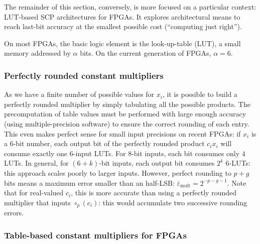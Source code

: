 \documentclass[twocolumn]{IEEEtran}
\newcommand{\abserr}{\varepsilon}
\newcommand{\maxerr}{\bound{\abserr}}
\newcommand{\bound}[1]{\overline{#1}}
\begin{document}
The remainder of this section, conversely, is more focused on a particular context: LUT-based SCP architectures for FPGAs.
It explores architectural means to reach last-bit accuracy at the smallest possible cost (``computing just right'').

On most FPGAs, the basic logic element is the look-up-table (LUT), a small memory addressed by $\alpha$ bits. 
On the current generation of  FPGAs, $\alpha=6$.

\subsubsection{Perfectly rounded constant multipliers}
\label{sec:tabulatedmults}
As we have a finite number of possible values for $x_i$, it is possible to build a perfectly rounded multiplier by simply tabulating all the possible products.
The precomputation of table values must be performed with large enough accuracy (using multiple-precision software) to ensure the correct rounding of each entry.  
This even makes perfect sense for small input precisions on recent FPGAs:
if $x_i$ is a 6-bit number, each output bit of the perfectly rounded product $c_ix_i$  will consume exactly one 6-input LUTs.
For 8-bit inputs, each bit consumes only $4$ LUTs. 
In general, for $(6+k)$-bit inputs, each output bit consumes $2^k$ 6-LUTs: this approach scales poorly to larger inputs.
 However, perfect rounding to $p+g$ bits means a maximum error smaller than an half-LSB: 
 $\maxerr_{\text{mult}}  = 2^{-p-g-1}$.
Note that for real-valued $c_i$, this is more accurate than using a perfectly rounded multiplier that inputs  $\circ_p(c_i)$: 
this would accumulate two successive rounding errors.

\subsubsection{Table-based constant multipliers for FPGAs}
\label{sec:KCMmults}
\end{document}
